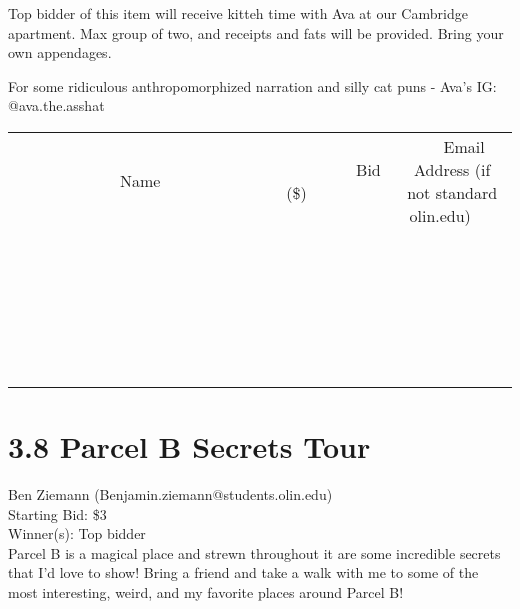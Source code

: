 \documentclass[11pt]{article}
\begin{document}
Top bidder of this item will receive kitteh time with Ava at our Cambridge apartment. Max group of two, and receipts and fats will be provided. Bring your own appendages.

For some ridiculous anthropomorphized narration and silly cat puns - Ava's IG: @ava.the.asshat \\[6ex]
\begin{tabular}{c c c}
~~~~~~~~~~~~~Name~~~~~~~~~~~~~ & ~~~~~~~~~Bid (\$)~~~~~~~~~ & ~~~Email Address (if not standard olin.edu)~~~ \\
 & & \\
\hline
 & & \\
\hline
 & & \\
\hline
 & & \\
\hline
 & & \\
\hline
 & & \\
\hline
 & & \\
\hline
 & & \\
\hline
 & & \\
\hline
 & & \\
\hline
 & & \\
\hline
 & & \\
\hline
 & & \\
\hline
 & & \\
\hline
 & & \\
\hline
 & & \\
\hline
 & & \\
\hline
 & & \\
\hline
 & & \\
\hline
 & & \\
\hline
 & & \\
\hline
 & & \\
\hline
 & & \\
\hline
 & & \\
\hline
 & & \\
\hline
 & & \\
\hline
\end{tabular}
\clearpage
\section*{3.8 Parcel B Secrets Tour}
Ben Ziemann (Benjamin.ziemann@students.olin.edu) \\
Starting Bid: \$3 \\
Winner(s): 
Top bidder \\
Parcel B is a magical place and strewn throughout it are some incredible secrets that I'd love to show! Bring a friend and take a walk with me to some of the most interesting, weird, and my favorite places around Parcel B! 
\end{document}
